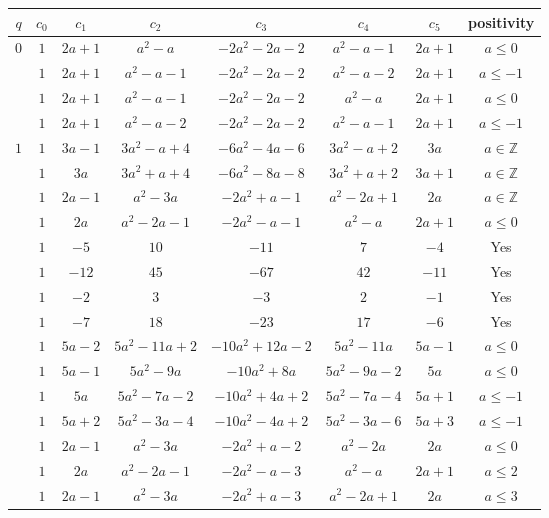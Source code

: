 \documentclass{amsart}
\theoremstyle{plain}
\theoremstyle{definition}
\theoremstyle{remark}
\begin{document}
\begin{small}
\begin{longtable}{|c||c|c|c|c|c|c|c|} \hline 
$q$ & $c_0$ & $c_1$ & $c_2$ & $c_3$ & $c_4$ & $c_5$ & positivity \\ \hline 
$0$ & $1$ & $2a+1$ & $a^2-a$ & $-2a^2-2a-2$ & $a^2-a-1$ & $2a+1$ & $a\leq 0$ \\ \cline{2-8}
& $1$ & $2a+1$ & $a^2-a-1$ & $-2a^2-2a-2$ & $a^2-a-2$ & $2a+1$ & $a\leq -1$ \\ \cline{2-8}
& $1$ & $2a+1$ & $a^2-a-1$ & $-2a^2-2a-2$ & $a^2-a$ & $2a+1$ & $a\leq 0$ \\ \cline{2-8}
& $1$ & $2a+1$ & $a^2-a-2$ & $-2a^2-2a-2$ & $a^2-a-1$ & $2a+1$ & $a\leq -1$ \\ \hline
$1$ & $1$ & $3a-1$ & $3a^2-a+4$ & $-6a^2-4a-6$ & $3a^2-a+2$ & $3a$ & $a\in\mathbb{Z}$ \\ \cline{2-8}
& $1$ & $3a$ & $3a^2+a+4$ & $-6a^2-8a-8$ & $3a^2+a+2$ & $3a+1$ & $a\in\mathbb{Z}$ \\ \cline{2-8}
& $1$ & $2a-1$ & $a^2-3a$ & $-2a^2+a-1$ & $a^2-2a+1$ & $2a$ & $a\in\mathbb{Z}$ \\ \cline{2-8}
& $1$ & $2a$ & $a^2-2a-1$ & $-2a^2-a-1$ & $a^2-a$ & $2a+1$ & $a\leq 0$ \\ \cline{2-8}
& $1$ & $-5$ & $10$ & $-11$ & $7$ & $-4$ & Yes \\ \cline{2-8}
& $1$ & $-12$ & $45$ & $-67$ & $42$ & $-11$ & Yes \\ \cline{2-8}
& $1$ & $-2$ & $3$ & $-3$ & $2$ & $-1$ & Yes \\ \cline{2-8}
& $1$ & $-7$ & $18$ & $-23$ & $17$ & $-6$ & Yes \\ \cline{2-8}
& $1$ & $5a-2$ & $5a^2-11a+2$ & $-10a^2+12a-2$ & $5a^2-11a$ & $5a-1$ & $a\leq 0$ \\ \cline{2-8}
& $1$ & $5a-1$ & $5a^2-9a$ & $-10a^2+8a$ & $5a^2-9a-2$ & $5a$ & $a\leq 0$ \\ \cline{2-8}
& $1$ & $5a$ & $5a^2-7a-2$ & $-10a^2+4a+2$ & $5a^2-7a-4$ & $5a+1$ & $a\leq -1$ \\ \cline{2-8}
& $1$ & $5a+2$ & $5a^2-3a-4$ & $-10a^2-4a+2$ & $5a^2-3a-6$ & $5a+3$ & $a\leq -1$ \\ \cline{2-8}
& $1$ & $2a-1$ & $a^2-3a$ & $-2a^2+a-2$ & $a^2-2a$ & $2a$ & $a\leq 0$ \\ \cline{2-8}
& $1$ & $2a$ & $a^2-2a-1$ & $-2a^2-a-3$ & $a^2-a$ & $2a+1$ & $a\leq 2$ \\ \cline{2-8}
& $1$ & $2a-1$ & $a^2-3a$ & $-2a^2+a-3$ & $a^2-2a+1$ & $2a$ & $a\leq 3$ \\ \cline{2-8}

\end{longtable}
\end{small}
\end{document}
